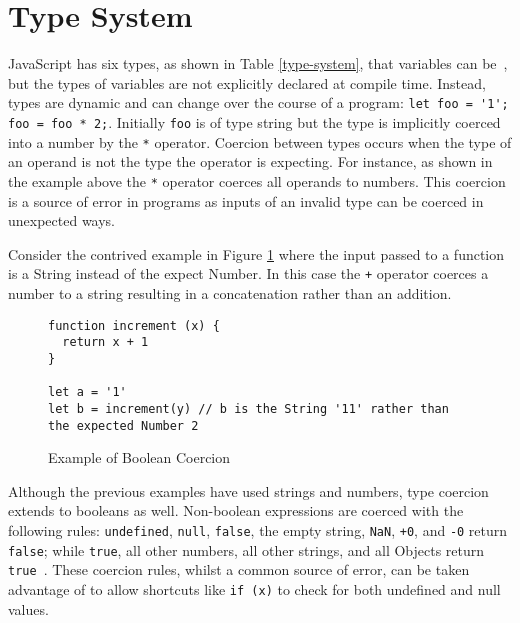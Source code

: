 \documentclass[]{final_report}
\begin{document}
\section{Type System}
JavaScript has six types, as shown in Table \ref{type-system}, that variables can be~\cite{EcmaScript}, but the types of variables are not explicitly declared at compile time. Instead, types are dynamic and can change over the course of a program: \lstinline{let foo = '1'; foo = foo * 2;}. Initially \lstinline{foo} is of type string but the type is implicitly coerced into a number by the \lstinline{*} operator. Coercion between types occurs when the type of an operand is not the type the operator is expecting. For instance, as shown in the example above the \lstinline{*} operator coerces all operands to numbers. This coercion is a source of error in programs as inputs of an invalid type can be coerced in unexpected ways.

Consider the contrived example in Figure \ref{fig:js-increment-concat} where the input passed to a function is a String instead of the expect Number. In this case the \lstinline|+| operator coerces a number to a string resulting in a concatenation rather than an addition.

\begin{figure}[t]
\begin{lstlisting}
function increment (x) {
  return x + 1
}

let a = '1'
let b = increment(y) // b is the String '11' rather than the expected Number 2
\end{lstlisting}
\caption{\label{fig:js-increment-concat} Example of Boolean Coercion}
\end{figure} 

Although the previous examples have used strings and numbers, type coercion extends to booleans as well. Non-boolean expressions are coerced with the following rules: \lstinline|undefined|, \lstinline|null|, \lstinline|false|, the empty string, \lstinline|NaN|, \lstinline|+0|, and \lstinline|-0| return \lstinline|false|; while \lstinline|true|, all other numbers, all other strings, and all Objects return \lstinline|true|~\cite{EcmaScript}. These coercion rules, whilst a common source of error, can be taken advantage of to allow shortcuts like \lstinline|if (x)| to check for both undefined and null values.
\end{document}
